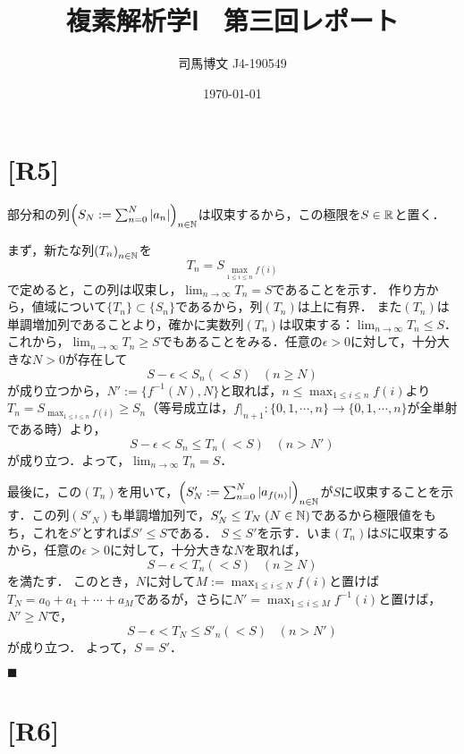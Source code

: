 \documentclass[uplatex, 12pt, dvipdfmx, twocolumn]{jsarticle}
\title{複素解析学Ⅰ　第三回レポート}
\author{司馬博文 J4-190549}
\date{\today}
\begin{document}
\maketitle

\section*{[R5]}

部分和の列$\left(S_N:=\sum^N_{n=0}|a_n|\right)_{n\in\mathbb{N}}$は収束するから，この極限を$S\in\mathbb{R}$と置く．

まず，新たな列$\left(T_n\right)_{n\in\mathbb{N}}$を
\[T_n=S_{\max_{1\le i\le n}f(i)}\]
で定めると，この列は収束し，$\lim_{n\to\infty}T_n=S$であることを示す．
作り方から，値域について$\{T_n\}\subset\{S_n\}$であるから，列$(T_n)$は上に有界．
また$(T_n)$は単調増加列であることより，確かに実数列$(T_n)$は収束する：$\lim_{n\to\infty}T_n\le S$．
これから，$\lim_{n\to\infty}T_n\ge S$でもあることをみる．任意の$\epsilon>0$に対して，十分大きな$N>0$が存在して
\[ S-\epsilon<S_n(<S)\;\;\;(n\ge N) \]
が成り立つから，$N':=\{f^{-1}(N),N\}$と取れば，$n\le \max_{1\le i\le n}f(i)$より$T_n=S_{\max_{1\le i\le n}f(i)}\ge S_n$（等号成立は，$f|_{n+1}:\{0,1,\cdots,n\}\to\{0,1,\cdots,n\}$が全単射である時）より，
\[S-\epsilon<S_n\le T_n(<S)\;\;\;(n>N')\]
が成り立つ．よって，$\lim_{n\to\infty}T_n=S$．

最後に，この$(T_n)$を用いて，$\left(S'_N:=\sum^N_{n=0}|a_{f(n)}|\right)_{n\in\mathbb{N}}$が$S$に収束することを示す．この列$(S'_N)$も単調増加列で，$S'_N\le T_N\;(N\in\mathbb{N})$であるから極限値をもち，これを$S'$とすれば$S'\le S$である．
$S\le S'$を示す．いま$(T_n)$は$S$に収束するから，任意の$\epsilon>0$に対して，十分大きな$N$を取れば，
\[S-\epsilon<T_n(<S)\;\;\;(n\ge N)\]
を満たす．
このとき，$N$に対して$M:=\max_{1\le i\le N}f(i)$と置けば$T_N=a_0+a_1+\cdots+a_M$であるが，さらに$N'=\max_{1\le i\le M}f^{-1}(i)$と置けば，$N'\ge N$で，
\[S-\epsilon<T_N\le S'_n(<S)\;\;\;(n>N')\]
が成り立つ．
よって，$S=S'$．
\begin{flushright}$\blacksquare$\end{flushright}

\section*{[R6]}
\end{document}
